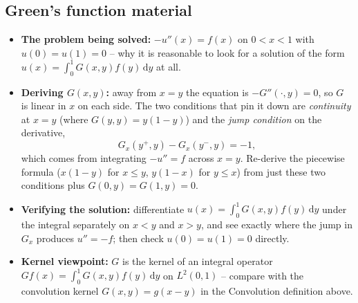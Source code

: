 \documentclass[11pt]{article}
\newcommand{\1}{\mathbf{1}}
\newcommand{\dd}{\,\mathrm{d}}
\theoremstyle{notestyle}
\theoremstyle{definition}
\begin{document}
\subsection*{Green's function material}
\begin{itemize}
    \item \textbf{The problem being solved:} $-u''(x) = f(x)$ on $0 < x < 1$ with
    $u(0) = u(1) = 0$ -- why it is reasonable to look for a solution of the form
    $u(x) = \int_0^1 G(x, y)f(y)\dd y$ at all.
    \item \textbf{Deriving $G(x,y)$:} away from $x = y$ the equation is
    $-G''(\cdot, y) = 0$, so $G$ is linear in $x$ on each side. The two conditions
    that pin it down are \emph{continuity} at $x = y$ (where $G(y,y) = y(1-y)$) and
    the \emph{jump condition} on the derivative,
    $$G_x(y^+, y) - G_x(y^-, y) = -1,$$
    which comes from integrating $-u'' = f$ across $x = y$. Re-derive the piecewise
    formula ($x(1-y)$ for $x \le y$, $y(1-x)$ for $y \le x$) from just these two
    conditions plus $G(0, y) = G(1, y) = 0$.
    \item \textbf{Verifying the solution:} differentiate
    $u(x) = \int_0^1 G(x,y)f(y)\dd y$ under the integral separately on $x < y$ and
    $x > y$, and see exactly where the jump in $G_x$ produces $u'' = -f$; then
    check $u(0) = u(1) = 0$ directly.
    \item \textbf{Kernel viewpoint:} $G$ is the kernel of an integral operator
    $Gf(x) = \int_0^1 G(x,y)f(y)\dd y$ on $L^2(0,1)$ -- compare with the
    convolution kernel $G(x, y) = g(x-y)$ in the Convolution definition above.
\end{itemize}
\end{document}
